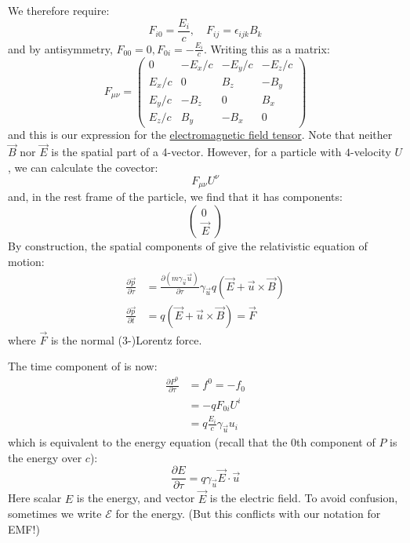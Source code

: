 \documentclass[../Main.tex]{subfiles}
\begin{document}
We therefore require:
\begin{equation*}
    F_{i0} = \frac{E_i}{c},\quad F_{ij} = \epsilon_{ijk} B_k
\end{equation*}
and by antisymmetry, $F_{00} = 0, F_{0i} = -\frac{E_i}{c}$. Writing this as a matrix:
\begin{equation}
    F_{\mu\nu} =
    \begin{pmatrix}
        0 & -E_x / c & -E_y / c & -E_z / c \\
        E_x / c & 0 & B_z & -B_y \\
        E_y / c & -B_z & 0 & B_x \\
        E_z / c & B_y & -B_x & 0
    \end{pmatrix}
    \label{eqnEMTensor}
\end{equation}
and this is our expression for the \underline{electromagnetic field tensor}. Note that neither $\vec{B}$ nor $\vec{E}$ is the spatial part of a 4-vector. However, for a particle with $4$-velocity $U$, we can calculate the covector:
\begin{equation*}
    F_{\mu \nu} U^\nu
\end{equation*}
and, in the rest frame of the particle, we find that it has components:
\begin{equation*}
    \begin{pmatrix}0 \\ \vec{E}\end{pmatrix}
\end{equation*}
By construction, the spatial components of  give the relativistic equation of motion:
\begin{align*}
    \frac{\partial \vec{p}}{\partial \tau} &= \frac{\partial (m\gamma_{\vec{u}} \vec{u})}{\partial \tau} \gamma_{\vec{u}} q(\vec{E} + \vec{u} \times \vec{B}) \\
    \frac{\partial \vec{p}}{\partial t} &= q(\vec{E} + \vec{u} \times \vec{B}) = \vec{F}
\end{align*}
where $\vec{F}$ is the normal (3-)Lorentz force.

The time component of  is now:
\begin{align*}
    \frac{\partial P^0}{\partial \tau} &= f^0 = -f_0 \\
    &= -q F_{0i} U^i \\
    &= q \frac{E_i}{c} \gamma_{\vec{u}} u_i
\end{align*}
which is equivalent to the energy equation (recall that the $0$th component of $P$ is the energy over $c$):
\begin{equation*}
    \frac{\partial E}{\partial \tau} = q \gamma_{\vec{u}} \vec{E} \cdot \vec{u}
\end{equation*}
Here scalar $E$ is the energy, and vector $\vec{E}$ is the electric field. To avoid confusion, sometimes we write $\mathcal{E}$ for the energy. (But this conflicts with our notation for EMF!)
\end{document}

